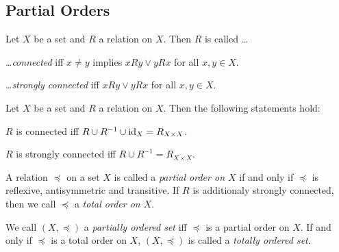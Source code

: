 \subsection{Partial Orders}

\begin{definition}
    Let $X$ be a set and $R$ a relation on $X$. Then $R$ is called \dots
    \begin{definitionenumerate}
        \item \dots \emph{connected} iff $x\neq y$ implies $xRy\lor yRx$ for all $x,y\in X$.
        \item \dots \emph{strongly connected} iff $xRy\lor yRx$ for all $x,y\in X$.
    \end{definitionenumerate}
\end{definition}

\begin{theorem}
    Let $X$ be a set and $R$ a relation on $X$. Then the following statements hold:
    \begin{intheoremenumerate}
        \item $R$ is connected iff $R\cup R^{-1}\cup\text{id}_X=R_{X\times X}$.
        \item $R$ is strongly connected iff $R\cup R^{-1}=R_{X\times X}$.
    \end{intheoremenumerate}
\end{theorem}

\begin{definition}
    A relation $\preceq$ on a set $X$ is called a \emph{partial order on $X$} if and only if $\preceq$ is reflexive, antisymmetric and transitive. If $R$ is additionaly strongly connected, then we call $\preceq$ a \emph{total order on $X$}.

    We call $(X,\preceq)$ a \emph{partially ordered set} iff $\preceq$ is a partial order on $X$. If and only if $\preceq$ is a total order on $X$, $(X,\preceq)$ is called a \emph{totally ordered set}.
\end{definition}

